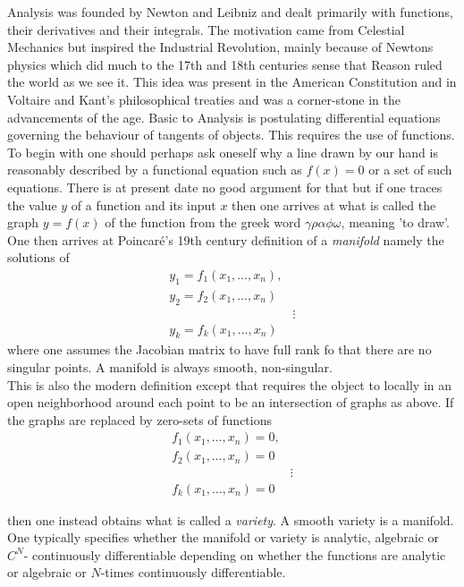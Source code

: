 \documentclass[10pt,a4paper]{amsart}
\begin{document}
Analysis was founded by Newton and Leibniz and dealt primarily with functions, their derivatives and their integrals. The motivation came from Celestial Mechanics but inspired the Industrial Revolution, mainly because of Newtons physics which did much to the 17th and 18th centuries sense that Reason ruled the world as we see it. This idea was present in the American Constitution and in Voltaire and Kant's philosophical treaties and was a corner-stone in the advancements of the age. 
Basic to Analysis is postulating differential equations governing the behaviour of tangents of objects. This requires the use of functions. 
To begin with one should perhaps ask oneself why a line drawn by our hand is reasonably described by a functional equation such as $f(x)=0$ or a set of such equations. There is at present date no good argument for that but if one traces the value $y$ of a function and its input $x$ then one arrives at what is called the graph $y=f(x)$ of the function from the greek word $\gamma\rho\alpha\phi\omega$, meaning 'to draw'. One then arrives at Poincaré's 19th century definition of a \emph{manifold} namely the solutions of
\begin{align*}
   y_1 = f_1(x_1,\dots, x_n), \\
   y_2= f_2(x_1,\dots, x_n)\\
   &\vdots\\
   y_k = f_k(x_1,\dots, x_n)
\end{align*}
where one assumes the Jacobian matrix to have full rank fo that there are no singular points. A manifold is always smooth, non-singular.\\
This is also the modern definition except that requires the object to locally in an open neighborhood around each point to be an intersection of graphs as above. If the graphs are replaced by zero-sets of functions 
\begin{align*}
   f_1(x_1,\dots, x_n)=0, \\
   f_2(x_1,\dots, x_n)=0\\
   &\vdots\\
   f_k(x_1,\dots, x_n)=0
\end{align*}

then one instead obtains what is called a \emph{variety}. A smooth variety is a manifold. One typically specifies whether the manifold or variety is analytic, algebraic or $C^N$- continuously differentiable depending on whether the functions are analytic or algebraic or $N$-times continuously differentiable.\\
\end{document}
